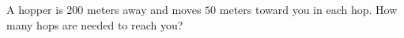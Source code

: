A hopper is $200$ meters away and moves $50$ meters toward you in each hop. How many hops are needed to reach you?
